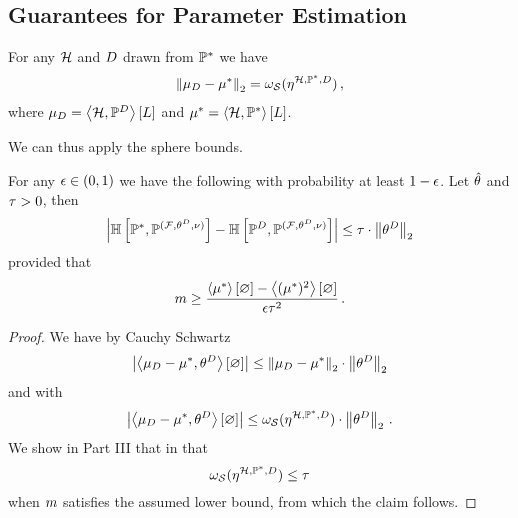 \subsection{Guarantees for Parameter Estimation}



\begin{lemma}\label{lem:meanParamDistance}
	For any $\mathcal{H}$ and $D$ drawn from $\mathbb{P}^*$ we have
	\begin{align*}
		\left\|\mu_{D} - \mu^*\right\|_{2} 
		= \omega_{\mathcal{S}}(\eta^{\mathcal{H},\mathbb{P}^*,D}) \, ,
	\end{align*}
	where $\mu_{D}=\left\langle \mathcal{H},\mathbb{P}^{D}\right\rangle \left[ L \right]$ and $\mu^*=\left\langle \mathcal{H},\mathbb{P}^*\right\rangle \left[ L \right]$.
\end{lemma}

%
We can thus apply the sphere bounds.


\begin{theorem}
	For any $\epsilon\in(0,1)$ we have the following with probability at least $1-\epsilon$.
	Let $\hat{\theta}$ and $\tau>0$, then
		\[ \left|\mathbb{H}\left[\mathbb{P}^*,\mathbb{P}^{(\mathcal{F},\theta^{D},\nu)}\right] - \mathbb{H}\left[\mathbb{P}^{D},\mathbb{P}^{(\mathcal{F},\theta^{D},\nu)}\right]\right| \leq \tau \cdot \left\|\theta^{D}\right\|_{2} \]
	provided that
		\[ m \geq \frac{\left\langle \mu^*\right\rangle \left[ \varnothing \right]-\left\langle (\mu^*)^2\right\rangle \left[ \varnothing \right]}{\epsilon \tau^2} \, . \]
\end{theorem}
\begin{proof}
	We have by Cauchy Schwartz 
		\[ \left|\left\langle \mu_{D} - \mu^*,\theta^{D}\right\rangle \left[ \varnothing \right]\right| \leq \left\|\mu_{D} - \mu^*\right\|_{2} \cdot \left\|\theta^{D}\right\|_{2}\]
	and with 
		\[ \left|\left\langle \mu_{D} - \mu^*,\theta^{D}\right\rangle \left[ \varnothing \right]\right| \leq \omega_{\mathcal{S}}(\eta^{\mathcal{H},\mathbb{P}^*,D}) \cdot \left\|\theta^{D}\right\|_{2} \, . \]
	We show in Part III that in  that
		\[  \omega_{\mathcal{S}}(\eta^{\mathcal{H},\mathbb{P}^*,D}) \leq \tau \]
	when $m$ satisfies the assumed lower bound, from which the claim follows.
\end{proof}






